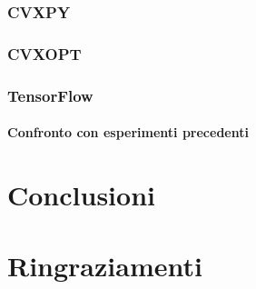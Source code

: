 \documentclass[a4paper,12pt]{report}
\begin{document}
\subsection{CVXPY}
\subsection{CVXOPT}
\subsection{TensorFlow}
\subsubsection{Confronto con esperimenti precedenti}

\chapter{Conclusioni}
\label{Conclusioni}

\chapter*{Ringraziamenti}
\label{Ringraziamenti}

%
%



\end{document}
